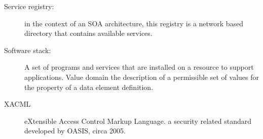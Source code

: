 \begin{description}
\item[Service registry:]	in the context of an SOA architecture, this registry is a network based directory that contains available services. 

\item[Software stack:]	A set of programs and services that are installed on a resource to support applications. 
Value domain	the description of a permissible set of values for the property of a data element definition. 

\item[XACML]  eXtensible Access Control Markup Language. a security related standard developed by OASIS, circa 2005. 

\end{description}
